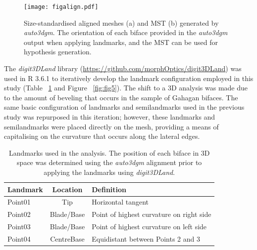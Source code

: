 \documentclass[review]{elsarticle}
\begin{document}
\begin{figure}[ht]\centering
\texttt{[image: figalign.pdf]}
\caption{Size-standardised aligned meshes (a) and MST (b) generated by \textit{auto3dgm}. The orientation of each biface provided in the \textit{auto3dgm} output when applying landmarks, and the MST can be used for hypothesis generation.}
\label{fig:fig4}
\end{figure}

The \textit{digit3DLand} library (\href{https://github.com/morphOptics/digit3DLand}{https://github.com/morphOptics/digit3DLand}) was used in R 3.6.1 \citep{R} to iteratively develop the landmark configuration employed in this study (Table ~\ref{tab:Tbl1} and Figure ~\ref{fig:fig5}). The shift to a 3D analysis was made due to the amount of beveling that occurs in the sample of Gahagan bifaces. The same basic configuration of landmarks and semilandmarks used in the previous study \citep[Figure 3]{RN11783} was repurposed in this iteration; however, these landmarks and semilandmarks were placed directly on the mesh, providing a means of capitalising on the curvature that occurs along the lateral edges.

\begin{table}[tbh]\centering
\footnotesize
\caption{Landmarks used in the analysis. The position of each biface in 3D space was determined using the \textit{auto3dgm} alignment prior to applying the landmarks using \textit{digit3DLand}.}
\centering
\begin{tabular}{lcp{7.5cm}}
\toprule
Landmark & Location & Definition\\
\midrule
Point01 & Tip & Horizontal tangent\\
Point02 & Blade/Base & Point of highest curvature on right side\\
Point03 & Blade/Base & Point of highest curvature on left side\\
Point04 & CentreBase & Equidistant between Points 2 and 3\\
\bottomrule
\end{tabular}
\label{tab:Tbl1}
\end{table}
\end{document}
